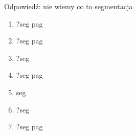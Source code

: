 Odpowiedź:
nie wiemy co to segmentacja
\begin{enumerate}
	\item ?seg pag
	\item ?seg pag
	\item ?seg
	\item ?seg pag
	\item seg
	\item ?seg
	\item ?seg pag
\end{enumerate}